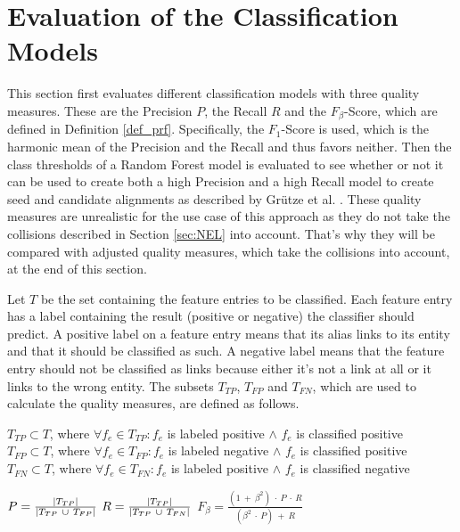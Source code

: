 \section{Evaluation of the Classification Models}
\label{sec:ModelEval}
This section first evaluates different classification models with three quality measures. These are the Precision $P$, the Recall $R$ and the $F_{\beta}$-Score, which are defined in Definition \ref{def_prf}. Specifically, the $F_1$-Score is used, which is the harmonic mean of the Precision and the Recall and thus favors neither. Then the class thresholds of a Random Forest model is evaluated to see whether or not it can be used to create both a high Precision and a high Recall model to create seed and candidate alignments as described by Grütze et al. \cite{coheel}. These quality measures are unrealistic for the use case of this approach as they do not take the collisions described in Section \ref{sec:NEL} into account. That's why they will be compared with adjusted quality measures, which take the collisions into account, at the end of this section.\par
Let $T$ be the set containing the feature entries to be classified. Each feature entry has a label containing the result (positive or negative) the classifier should predict. A positive label on a feature entry means that its alias links to its entity and that it should be classified as such. A negative label means that the feature entry should not be classified as links because either it's not a link at all or it links to the wrong entity. The subsets $T_{TP}$, $T_{FP}$ and $T_{FN}$, which are used to calculate the quality measures, are defined as follows.\\
\begin{nscenter}
	$T_{TP} \subset T$, where $\forall f_e \in T_{TP}: f_e$ is labeled positive $\land$ $f_e$ is classified positive\\
	$T_{FP} \subset T$, where $\forall f_e \in T_{FP}: f_e$ is labeled negative $\land$ $f_e$ is classified positive\\
	$T_{FN} \subset T$, where $\forall f_e \in T_{FN}: f_e$ is labeled positive $\land$ $f_e$ is classified negative\\
\end{nscenter}
\begin{definition}
$P = \frac{\left|T_{TP}\right|}{\left|T_{TP} \ \cup \ T_{FP}\right|}$
$R = \frac{\left|T_{TP}\right|}{\left|T_{TP} \ \cup \ T_{FN}\right|}$
$F_{\beta} = \frac{(1 \ + \ \beta^2) \ \cdot \ P \ \cdot \ R}{(\beta^2 \ \cdot \ P) \ + \ R}$
\label{def_prf}
\end{definition}
